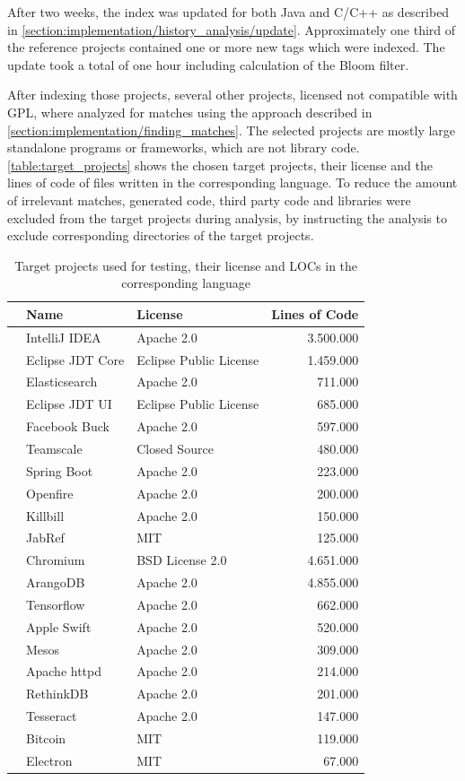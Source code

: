 After two weeks, the index was updated for both Java and C/C++ as described in \autoref{section:implementation/history_analysis/update}.
Approximately one third of the reference projects contained one or more new tags which were indexed.
The update took a total of one hour including calculation of the Bloom filter.

After indexing those projects, several other projects, licensed not compatible with GPL, where analyzed for matches using the approach described in \autoref{section:implementation/finding_matches}.
The selected projects are mostly large standalone programs or frameworks, which are not library code.
\autoref{table:target_projects} shows the chosen target projects, their license and the lines of code of files written in the corresponding language.
To reduce the amount of irrelevant matches, generated code, third party code and libraries were excluded from the target projects during analysis, by instructing the analysis to exclude corresponding directories of the target projects.

\begin{table}[ht]
	\centering
	\begin{tabular}{l|llr}
		& \textbf{Name} & \textbf{License} & \textbf{Lines of Code} \\
		\hline 
		\parbox[t]{2mm}{} 
		& IntelliJ IDEA & Apache 2.0 & 3.500.000 \\
		& Eclipse JDT Core & Eclipse Public License & 1.459.000 \\
		& Elasticsearch & Apache 2.0 & 711.000 \\
		& Eclipse JDT UI & Eclipse Public License & 685.000 \\
		& Facebook Buck & Apache 2.0 & 597.000 \\
		& Teamscale & Closed Source & 480.000 \\
		& Spring Boot & Apache 2.0 & 223.000 \\
		& Openfire & Apache 2.0 & 200.000 \\
		& Killbill & Apache 2.0 & 150.000 \\
		& JabRef & MIT & 125.000 \\
		\hline 
		\parbox[t]{2mm}{} 
		& Chromium & BSD License 2.0 & 4.651.000 \\
		& ArangoDB & Apache 2.0 & 4.855.000 \\
		& Tensorflow & Apache 2.0 & 662.000 \\
		& Apple Swift & Apache 2.0 & 520.000 \\
		& Mesos & Apache 2.0 & 309.000 \\
		& Apache httpd & Apache 2.0 & 214.000 \\
		& RethinkDB & Apache 2.0 & 201.000 \\
		& Tesseract & Apache 2.0 & 147.000 \\
		& Bitcoin & MIT & 119.000 \\
		& Electron & MIT & 67.000 \\
	\end{tabular}
	\caption{Target projects used for testing, their license and LOCs in the corresponding language}\label{table:target_projects}
\end{table}

